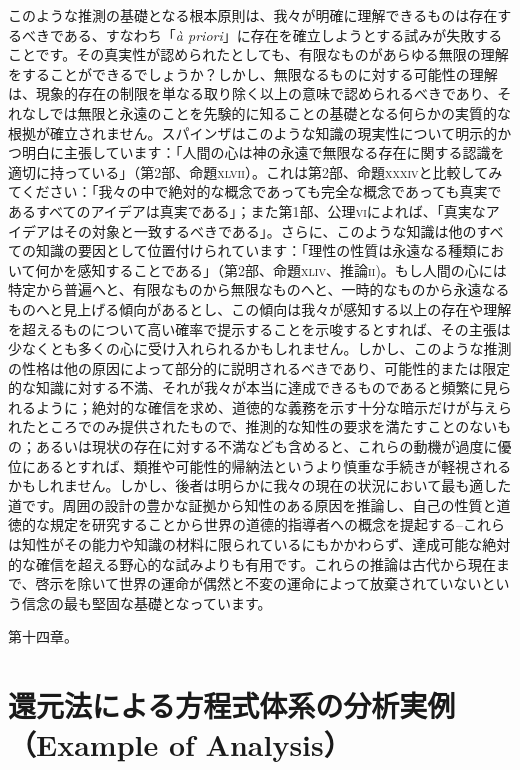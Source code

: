 \documentclass[a4paper,11pt,openany]{ltjsbook}
\begin{document}
このような推測の基礎となる根本原則は、我々が明確に理解できるものは存在するべきである、すなわち「\textit{\`{a} priori}」に存在を確立しようとする試みが失敗することです。その真実性が認められたとしても、有限なものがあらゆる無限の理解をすることができるでしょうか？しかし、無限なるものに対する可能性の理解は、現象的存在の制限を単なる取り除く以上の意味で認められるべきであり、それなしでは無限と永遠のことを先験的に知ることの基礎となる何らかの実質的な根拠が確立されません。スパインザはこのような知識の現実性について明示的かつ明白に主張しています：「人間の心は神の永遠で無限なる存在に関する認識を適切に持っている」（第2部、命題\textsc{xlvii}）。これは第2部、命題\textsc{xxxiv}と比較してみてください：「我々の中で絶対的な概念であっても完全な概念であっても真実であるすべてのアイデアは真実である」；また第1部、公理\textsc{vi}によれば、「真実なアイデアはその対象と一致するべきである」。さらに、このような知識は他のすべての知識の要因として位置付けられています：「理性の性質は永遠なる種類において何かを感知することである」（第2部、命題\textsc{xliv}、推論\textsc{ii})。もし人間の心には特定から普遍へと、有限なものから無限なものへと、一時的なものから永遠なるものへと見上げる傾向があるとし、この傾向は我々が感知する以上の存在や理解を超えるものについて高い確率で提示することを示唆するとすれば、その主張は少なくとも多くの心に受け入れられるかもしれません。しかし、このような推測の性格は他の原因によって部分的に説明されるべきであり、可能性的または限定的な知識に対する不満、それが我々が本当に達成できるものであると頻繁に見られるように；絶対的な確信を求め、道徳的な義務を示す十分な暗示だけが与えられたところでのみ提供されたもので、推測的な知性の要求を満たすことのないもの；あるいは現状の存在に対する不満なども含めると、これらの動機が過度に優位にあるとすれば、類推や可能性的帰納法というより慎重な手続きが軽視されるかもしれません。しかし、後者は明らかに我々の現在の状況において最も適した道です。周囲の設計の豊かな証拠から知性のある原因を推論し、自己の性質と道徳的な規定を研究することから世界の道德的指導者への概念を提起する--これらは知性がその能力や知識の材料に限られているにもかかわらず、達成可能な絶対的な確信を超える野心的な試みよりも有用です。これらの推論は古代から現在まで、啓示を除いて世界の運命が偶然と不変の運命によって放棄されていないという信念の最も堅固な基礎となっています。

第十四章。

\setcounter{chapter}{13}

\newpage

\chapter{還元法による方程式体系の分析実例（Example of Analysis）}
\label{ch:xiv}
\end{document}
